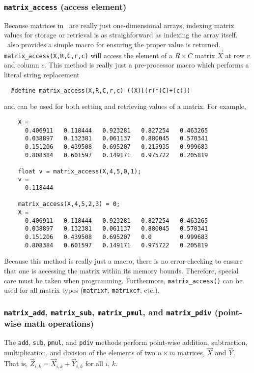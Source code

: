 \subsubsection{{\tt matrix\_access} (access element)}
\label{module:matrix:access}
Because matrices in \liquid\ are really just one-dimensional arrays, indexing
matrix values for storage or retrieval is as straighforward as indexing the
array itself.
\liquid\ also provides a simple macro for ensuring the proper value is
returned.
{\tt matrix\_access(X,R,C,r,c)} will access the element of a $R \times C$
matrix $\vec{X}$ at row $r$ and column $c$.
This method is really just a pre-processor macro which performs a literal
string replacement
\begin{verbatim}
  #define matrix_access(X,R,C,r,c) ((X)[(r)*(C)+(c)])
\end{verbatim}
and can be used for both setting and retrieving values of a matrix.
For example,
\begin{verbatim}
    X = 
      0.406911   0.118444   0.923281   0.827254   0.463265
      0.038897   0.132381   0.061137   0.880045   0.570341
      0.151206   0.439508   0.695207   0.215935   0.999683
      0.808384   0.601597   0.149171   0.975722   0.205819

    float v = matrix_access(X,4,5,0,1);
    v =
      0.118444

    matrix_access(X,4,5,2,3) = 0;
    X =
      0.406911   0.118444   0.923281   0.827254   0.463265
      0.038897   0.132381   0.061137   0.880045   0.570341
      0.151206   0.439508   0.695207   0.0        0.999683
      0.808384   0.601597   0.149171   0.975722   0.205819
\end{verbatim}
Because this method is really just a macro, there is no error-checking to
ensure that one is accessing the matrix within its memory bounds.
Therefore, special care must be taken when programming.
Furthermore, {\tt matrix\_access()} can be used for all matrix types
({\tt matrixf}, {\tt matrixcf}, etc.).

\subsubsection{{\tt matrix\_add}, {\tt matrix\_sub}, {\tt matrix\_pmul},
and {\tt matrix\_pdiv} (point-wise math operations)}
\label{module:matrix:mathop}
The {\tt add}, {\tt sub}, {\tt pmul}, and {\tt pdiv} methods perform
point-wise addition, subtraction, multiplication, and division of the elements
of two $n \times m$ matrices, $\vec{X}$ and $\vec{Y}$.
That is, $\vec{Z}_{i,k} = \vec{X}_{i,k} + \vec{Y}_{i,k}$ for all $i$, $k$.

